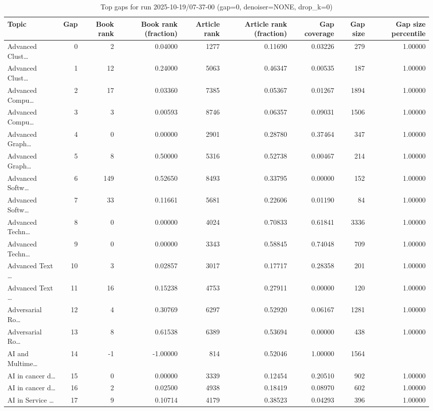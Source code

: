 \begin{table}
\caption{Top gaps for run 2025-10-19/07-37-00 (gap=0, denoiser=NONE, drop\_k=0)}
\label{tab:best_run_gap0_2025_10_19_07_37_00}
\begin{tabular}{lrrrrrrrr}
\toprule
Topic & Gap & Book rank & Book rank (fraction) & Article rank & Article rank (fraction) & Gap coverage & Gap size & Gap size percentile \\
\midrule
Advanced Clust… & 0 & 2 & 0.04000 & 1277 & 0.11690 & 0.03226 & 279 & 1.00000 \\
Advanced Clust… & 1 & 12 & 0.24000 & 5063 & 0.46347 & 0.00535 & 187 & 1.00000 \\
Advanced Compu… & 2 & 17 & 0.03360 & 7385 & 0.05367 & 0.01267 & 1894 & 1.00000 \\
Advanced Compu… & 3 & 3 & 0.00593 & 8746 & 0.06357 & 0.09031 & 1506 & 1.00000 \\
Advanced Graph… & 4 & 0 & 0.00000 & 2901 & 0.28780 & 0.37464 & 347 & 1.00000 \\
Advanced Graph… & 5 & 8 & 0.50000 & 5316 & 0.52738 & 0.00467 & 214 & 1.00000 \\
Advanced Softw… & 6 & 149 & 0.52650 & 8493 & 0.33795 & 0.00000 & 152 & 1.00000 \\
Advanced Softw… & 7 & 33 & 0.11661 & 5681 & 0.22606 & 0.01190 & 84 & 1.00000 \\
Advanced Techn… & 8 & 0 & 0.00000 & 4024 & 0.70833 & 0.61841 & 3336 & 1.00000 \\
Advanced Techn… & 9 & 0 & 0.00000 & 3343 & 0.58845 & 0.74048 & 709 & 1.00000 \\
Advanced Text … & 10 & 3 & 0.02857 & 3017 & 0.17717 & 0.28358 & 201 & 1.00000 \\
Advanced Text … & 11 & 16 & 0.15238 & 4753 & 0.27911 & 0.00000 & 120 & 1.00000 \\
Adversarial Ro… & 12 & 4 & 0.30769 & 6297 & 0.52920 & 0.06167 & 1281 & 1.00000 \\
Adversarial Ro… & 13 & 8 & 0.61538 & 6389 & 0.53694 & 0.00000 & 438 & 1.00000 \\
AI and Multime… & 14 & -1 & -1.00000 & 814 & 0.52046 & 1.00000 & 1564 &  \\
AI in cancer d… & 15 & 0 & 0.00000 & 3339 & 0.12454 & 0.20510 & 902 & 1.00000 \\
AI in cancer d… & 16 & 2 & 0.02500 & 4938 & 0.18419 & 0.08970 & 602 & 1.00000 \\
AI in Service … & 17 & 9 & 0.10714 & 4179 & 0.38523 & 0.04293 & 396 & 1.00000 \\

\end{tabular}
\end{table}
